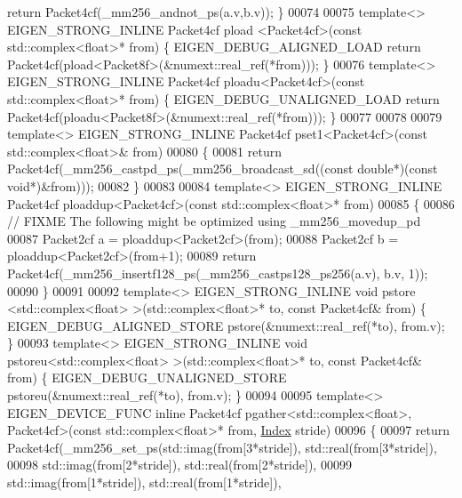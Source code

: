 \begin{DoxyCode}
{      return} Packet4cf(\_mm256\_andnot\_ps(a.v,b.v)); \}
00074 
00075 \textcolor{keyword}{template}<> EIGEN\_STRONG\_INLINE Packet4cf pload <Packet4cf>(\textcolor{keyword}{const} std::complex<float>* from) \{ 
      EIGEN\_DEBUG\_ALIGNED\_LOAD \textcolor{keywordflow}{return} Packet4cf(pload<Packet8f>(&numext::real\_ref(*from))); \}
00076 \textcolor{keyword}{template}<> EIGEN\_STRONG\_INLINE Packet4cf ploadu<Packet4cf>(\textcolor{keyword}{const} std::complex<float>* from) \{ 
      EIGEN\_DEBUG\_UNALIGNED\_LOAD \textcolor{keywordflow}{return} Packet4cf(ploadu<Packet8f>(&numext::real\_ref(*from))); \}
00077 
00078 
00079 \textcolor{keyword}{template}<> EIGEN\_STRONG\_INLINE Packet4cf pset1<Packet4cf>(\textcolor{keyword}{const} std::complex<float>& from)
00080 \{
00081   \textcolor{keywordflow}{return} Packet4cf(\_mm256\_castpd\_ps(\_mm256\_broadcast\_sd((\textcolor{keyword}{const} \textcolor{keywordtype}{double}*)(\textcolor{keyword}{const} \textcolor{keywordtype}{void}*)&from)));
00082 \}
00083 
00084 \textcolor{keyword}{template}<> EIGEN\_STRONG\_INLINE Packet4cf ploaddup<Packet4cf>(\textcolor{keyword}{const} std::complex<float>* from)
00085 \{
00086   \textcolor{comment}{// FIXME The following might be optimized using \_mm256\_movedup\_pd}
00087   Packet2cf a = ploaddup<Packet2cf>(from);
00088   Packet2cf b = ploaddup<Packet2cf>(from+1);
00089   \textcolor{keywordflow}{return}  Packet4cf(\_mm256\_insertf128\_ps(\_mm256\_castps128\_ps256(a.v), b.v, 1));
00090 \}
00091 
00092 \textcolor{keyword}{template}<> EIGEN\_STRONG\_INLINE \textcolor{keywordtype}{void} pstore <std::complex<float> >(std::complex<float>* to, \textcolor{keyword}{const} Packet4cf&
       from) \{ EIGEN\_DEBUG\_ALIGNED\_STORE pstore(&numext::real\_ref(*to), from.v); \}
00093 \textcolor{keyword}{template}<> EIGEN\_STRONG\_INLINE \textcolor{keywordtype}{void} pstoreu<std::complex<float> >(std::complex<float>* to, \textcolor{keyword}{const} Packet4cf&
       from) \{ EIGEN\_DEBUG\_UNALIGNED\_STORE pstoreu(&numext::real\_ref(*to), from.v); \}
00094 
00095 \textcolor{keyword}{template}<> EIGEN\_DEVICE\_FUNC \textcolor{keyword}{inline} Packet4cf pgather<std::complex<float>, Packet4cf>(\textcolor{keyword}{const} 
      std::complex<float>* from, \hyperlink{namespace_eigen_a62e77e0933482dafde8fe197d9a2cfde}{Index} stride)
00096 \{
00097   \textcolor{keywordflow}{return} Packet4cf(\_mm256\_set\_ps(std::imag(from[3*stride]), std::real(from[3*stride]),
00098                                  std::imag(from[2*stride]), std::real(from[2*stride]),
00099                                  std::imag(from[1*stride]), std::real(from[1*stride]),

\end{DoxyCode}
